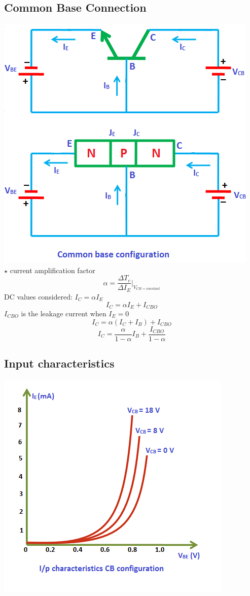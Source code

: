 \documentclass[10pt, a4paper]{report}
\begin{document}
	\subsection{Common Base Connection}
	\includegraphics[width=0.8\linewidth]{img/npn cb} \\
	$\star$ current amplification factor $$ \alpha = \dfrac{\Delta T_c}{\Delta I_E} \rvert_{V_{CB = constant}}$$
	DC values considered: $ I_C = \alpha I_E $
	$$I_C = \alpha I_E + I_{CBO}$$
	$ I_{CBO} $ is the leakage current when $ I_E = 0 $
	$$I_C = \alpha (I_C + I_B)+I_{CBO}$$
	$$I_C= \dfrac{\alpha}{1-\alpha}I_B + \dfrac{I_{CBO}}{1-\alpha}$$
	
	\subsection{Input characteristics}
	\includegraphics[width=0.6\linewidth]{img/inputcharacteristicscbconfiguration}
\end{document}
